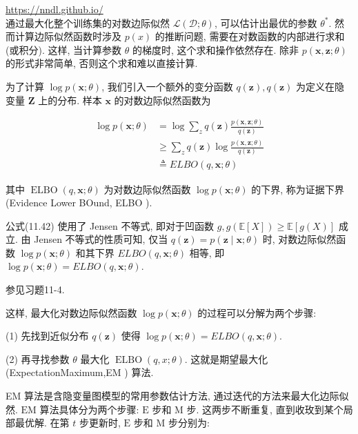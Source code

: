 \documentclass[10pt]{article}
\begin{document}
\href{https://nndl.github.io/}{https://nndl.github.io/}\\
通过最大化整个训练集的对数边际似然 $\mathcal{L}(\mathcal{D} ; \theta)$, 可以估计出最优的参数 $\theta^{*}$. 然而计算边际似然函数时涉及 $p(x)$ 的推断问题, 需要在对数函数的内部进行求和 (或积分). 这样, 当计算参数 $\theta$ 的梯度时, 这个求和操作依然存在. 除非 $p(\boldsymbol{x}, \boldsymbol{z} ; \theta)$ 的形式非常简单, 否则这个求和难以直接计算.

为了计算 $\log p(\boldsymbol{x} ; \theta)$, 我们引入一个额外的变分函数 $q(\boldsymbol{z}), q(\boldsymbol{z})$ 为定义在隐变量 $\boldsymbol{Z}$ 上的分布. 样本 $\boldsymbol{x}$ 的对数边际似然函数为


\begin{align*}
\log p(\boldsymbol{x} ; \theta) & =\log \sum_{z} q(\boldsymbol{z}) \frac{p(\boldsymbol{x}, \boldsymbol{z} ; \theta)}{q(\boldsymbol{z})}  \tag{11.41}\\
& \geq \sum_{z} q(\boldsymbol{z}) \log \frac{p(\boldsymbol{x}, \boldsymbol{z} ; \theta)}{q(\boldsymbol{z})}  \tag{11.42}\\
& \triangleq E L B O(q, \boldsymbol{x} ; \theta) \tag{11.43}
\end{align*}


其中 $\operatorname{ELBO}(q, \boldsymbol{x} ; \theta)$ 为对数边际似然函数 $\log p(\boldsymbol{x} ; \theta)$ 的下界, 称为证据下界 (Evidence Lower BOund, ELBO ).

公式(11.42) 使用了 Jensen 不等式, 即对于凹函数 $g, g(\mathbb{E}[X]) \geq \mathbb{E}[g(X)]$ 成立. 由 Jensen 不等式的性质可知, 仅当 $q(\boldsymbol{z})=p(\boldsymbol{z} \mid \boldsymbol{x} ; \theta)$ 时, 对数边际似然函数 $\log p(\boldsymbol{x} ; \theta)$ 和其下界 $E L B O(q, \boldsymbol{x} ; \theta)$ 相等, 即 $\log p(\boldsymbol{x} ; \theta)=E L B O(q, \boldsymbol{x} ; \theta)$.

参见习题11-4.

这样, 最大化对数边际似然函数 $\log p(\boldsymbol{x} ; \theta)$ 的过程可以分解为两个步骤:

(1) 先找到近似分布 $q(\boldsymbol{z})$ 使得 $\log p(\boldsymbol{x} ; \theta)=E L B O(q, \boldsymbol{x} ; \theta)$.

(2) 再寻找参数 $\theta$ 最大化 $\operatorname{ELBO}(q, x ; \theta)$. 这就是期望最大化 (ExpectationMaximum,EM ) 算法.

EM 算法是含隐变量图模型的常用参数估计方法, 通过迭代的方法来最大化边际似然. $\mathrm{EM}$ 算法具体分为两个步骤: $\mathrm{E}$ 步和 $\mathrm{M}$ 步. 这两步不断重复, 直到收玫到某个局部最优解. 在第 $t$ 步更新时, $\mathrm{E}$ 步和 $\mathrm{M}$ 步分别为:
\end{document}
